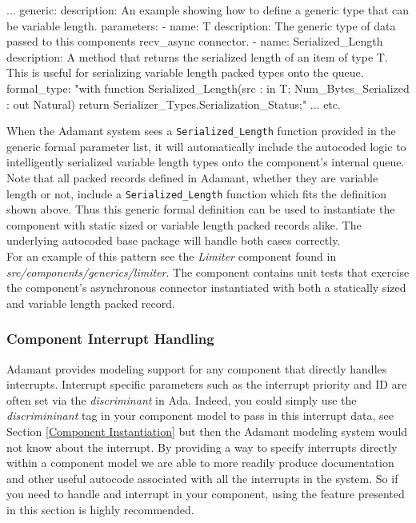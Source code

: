 \vspace{5mm} %
\begin{yamlcode}
...
generic:
  description: An example showing how to define a generic type that can be variable length.
  parameters:
    - name: T
      description: The generic type of data passed to this components recv_async connector.
    - name: Serialized_Length
      description: A method that returns the serialized length of an item of type T. This is useful for serializing variable length packed types onto the queue.
      formal_type: "with function Serialized_Length(src : in T; Num_Bytes_Serialized : out Natural) return Serializer_Types.Serialization_Status;"
...
etc.
\end{yamlcode}
\vspace{5mm} %

When the Adamant system sees a \texttt{Serialized\_Length} function provided in the generic formal parameter list, it will automatically include the autocoded logic to intelligently serialized variable length types onto the component's internal queue. Note that all packed records defined in Adamant, whether they are variable length or not, include a \texttt{Serialized\_Length} function which fits the definition shown above. Thus this generic formal definition can be used to instantiate the component with static sized or variable length packed records alike. The underlying autocoded base package will handle both cases correctly. \\

For an example of this pattern see the \textit{Limiter} component found in \textit{src/components/generics/limiter}. The component contains unit tests that exercise the component's asynchronous connector instantiated with both a statically sized and variable length packed record.

\subsubsection{Component Interrupt Handling} \label{Component Interrupt Handling}

Adamant provides modeling support for any component that directly handles interrupts. Interrupt specific parameters such as the interrupt priority and ID are often set via the \textit{discriminant} in Ada. Indeed, you could simply use the \textit{discrimininant} tag in your component model to pass in this interrupt data, see Section \ref{Component Instantiation} but then the Adamant modeling system would not know about the interrupt. By providing a way to specify interrupts directly within a component model we are able to more readily produce documentation and other useful autocode associated with all the interrupts in the system. So if you need to handle and interrupt in your component, using the feature presented in this section is highly recommended. \\


